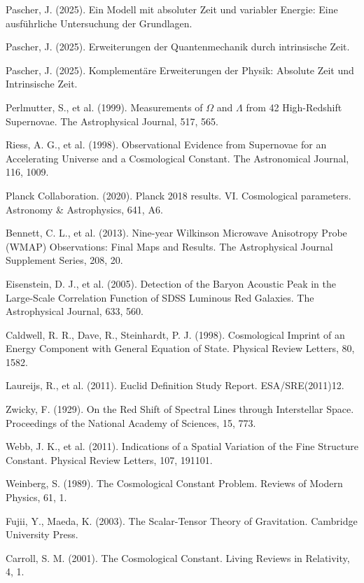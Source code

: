 \documentclass[a4paper,12pt]{article}
\begin{document}
\begin{thebibliography}{99}
	
	 Pascher, J. (2025). Ein Modell mit absoluter Zeit und variabler Energie: Eine ausführliche Untersuchung der Grundlagen.
	
	 Pascher, J. (2025). Erweiterungen der Quantenmechanik durch intrinsische Zeit.
	
	 Pascher, J. (2025). Komplementäre Erweiterungen der Physik: Absolute Zeit und Intrinsische Zeit.
	
	 Perlmutter, S., et al. (1999). Measurements of $\Omega$ and $\Lambda$ from 42 High-Redshift Supernovae. The Astrophysical Journal, 517, 565.
	
	 Riess, A. G., et al. (1998). Observational Evidence from Supernovae for an Accelerating Universe and a Cosmological Constant. The Astronomical Journal, 116, 1009.
	
	 Planck Collaboration. (2020). Planck 2018 results. VI. Cosmological parameters. Astronomy \& Astrophysics, 641, A6.
	
	 Bennett, C. L., et al. (2013). Nine-year Wilkinson Microwave Anisotropy Probe (WMAP) Observations: Final Maps and Results. The Astrophysical Journal Supplement Series, 208, 20.
	
	 Eisenstein, D. J., et al. (2005). Detection of the Baryon Acoustic Peak in the Large-Scale Correlation Function of SDSS Luminous Red Galaxies. The Astrophysical Journal, 633, 560.
	
	 Caldwell, R. R., Dave, R., Steinhardt, P. J. (1998). Cosmological Imprint of an Energy Component with General Equation of State. Physical Review Letters, 80, 1582.
	
	 Laureijs, R., et al. (2011). Euclid Definition Study Report. ESA/SRE(2011)12.
	
	 Zwicky, F. (1929). On the Red Shift of Spectral Lines through Interstellar Space. Proceedings of the National Academy of Sciences, 15, 773.
	
	 Webb, J. K., et al. (2011). Indications of a Spatial Variation of the Fine Structure Constant. Physical Review Letters, 107, 191101.
	
	 Weinberg, S. (1989). The Cosmological Constant Problem. Reviews of Modern Physics, 61, 1.
	
	 Fujii, Y., Maeda, K. (2003). The Scalar-Tensor Theory of Gravitation. Cambridge University Press.
	
	 Carroll, S. M. (2001). The Cosmological Constant. Living Reviews in Relativity, 4, 1.
	
\end{thebibliography}
\end{document}
